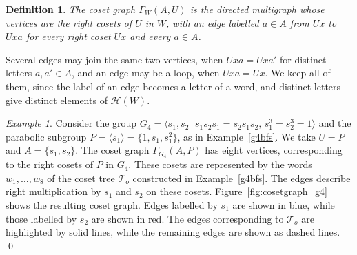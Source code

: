 \documentclass[11pt, reqno]{amsart}
\newcommand{\cH}{\mathcal{H}}
\numberwithin{equation}{section}
\newtheorem{definition}[theorem]{Definition}
\theoremstyle{remark}
\newtheorem{example}[theorem]{Example}
\begin{document}
\begin{definition}\label{def:cosetgraph}{\rm
The \emph{coset graph} $\Gamma_W(A,U)$ is the
directed multigraph whose vertices are the right cosets of $U$ in $W$,
with an edge labelled $a\in A$ from $Ux$ to $Uxa$ for every right coset
$Ux$ and every $a\in A$.}
\end{definition}


Several edges may join the same two vertices, when $Uxa=Uxa'$ for
distinct letters $a,a'\in A$, and an edge may be a loop, when $Uxa=Ux$.
We keep all of them, since the label of an edge becomes a letter of a
word, and distinct letters give distinct elements of $\cH(W)$.





\begin{example}\label{graph:G4}
	Consider the group $G_4=\langle s_1,s_2 \,|\, s_1s_2s_1=s_2s_1s_2,\, s_1^3=s_2^3=1\rangle$ and the parabolic subgroup
	$P=\langle s_1\rangle=\{1,s_1,s_1^2\}$,
	as in Example~\ref{g4bfs}.
	We take $U=P$ and $A=\{s_1,s_2\}$. The coset graph
	$\Gamma_{G_4}(A,P)$ has eight vertices, corresponding
	to the right cosets of $P$ in $G_4$.
	These cosets are represented by the words
	$w_1,\ldots,w_8$ of the coset tree
	$\mathcal T_o$ constructed in
	Example~\ref{g4bfs}.
	The edges describe right multiplication by
	$s_1$ and $s_2$ on these cosets.
	Figure~\ref{fig:cosetgraph_g4} shows the
	resulting coset graph.
	Edges labelled by $s_1$ are shown in blue,
	while those labelled by $s_2$ are shown in red.
	The edges corresponding to $\mathcal T_o$
	are highlighted by solid lines, while the
	remaining edges are shown as dashed lines. \qed
\end{example}
\end{document}
